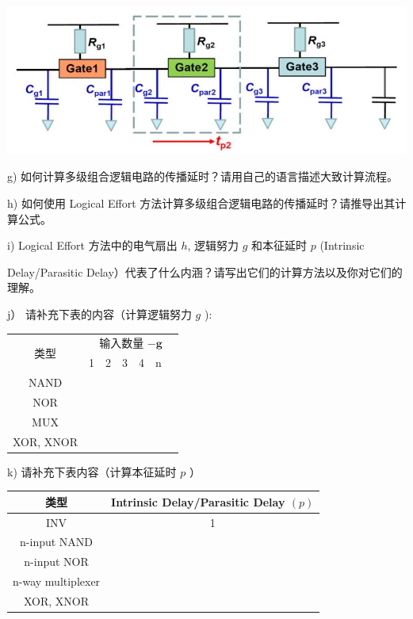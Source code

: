 \documentclass[10pt]{article}
\begin{document}
\begin{center}
\includegraphics[max width=\textwidth]{2024_05_20_f1af48ad54173fe448ecg-6}
\end{center}

g) 如何计算多级组合逻辑电路的传播延时？请用自己的语言描述大致计算流程。

h) 如何使用 Logical Effort 方法计算多级组合逻辑电路的传播延时？请推导出其计算公式。

i) Logical Effort 方法中的电气扇出 $h$, 逻辑努力 $g$ 和本征延时 $p$ (Intrinsic

Delay/Parasitic Delay）代表了什么内涵？请写出它们的计算方法以及你对它们的理解。

j） 请补充下表的内容（计算逻辑努力 $g$ ):

\begin{center}
\begin{tabular}{|c|c|c|c|c|c|}
\hline
\multirow{2}{*}{类型} & \multicolumn{6}{|c|}{输入数量 $-\boldsymbol{g}$} \\
\cline { 2 - 6 }
 & 1 & 2 & 3 & 4 & $\mathrm{n}$ &  \\
\hline
NAND &  &  &  &  &  &  \\
\hline
NOR &  &  &  &  &  &  \\
\hline
MUX &  &  &  &  &  &  \\
\hline
XOR, XNOR &  &  &  &  &  &  \\
\hline
\end{tabular}
\end{center}

k) 请补充下表内容（计算本征延时 $p$ ）

\begin{center}
\begin{tabular}{|c|c|}
\hline
类型 & Intrinsic Delay/Parasitic Delay $(p)$ \\
\hline
INV & 1 \\
\hline
n-input NAND &  \\
\hline
n-input NOR &  \\
\hline
n-way multiplexer &  \\
\hline
XOR, XNOR &  \\
\hline
\end{tabular}
\end{center}
\end{document}
